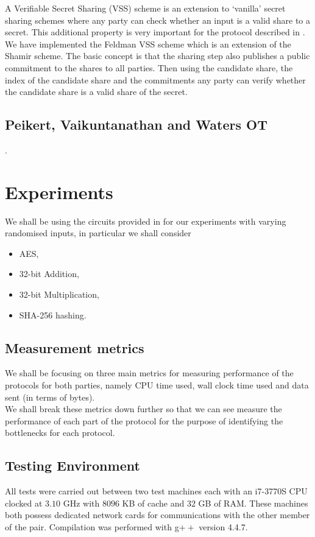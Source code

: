 \documentclass[ %
                    author={Nicholas Tutte},
                supervisor={Prof. Nigel Smart},
                    degree={MEng},
                     title={Secure Two Party Computation},
                  subtitle={A practical comparison of recent protocols},
                      type={Research - GG1K},
                      year={2015} ]{dissertation}
\begin{document}
				A Verifiable Secret Sharing (VSS) scheme is an extension to `vanilla' secret sharing schemes where any party can check whether an input is a valid share to a secret. This additional property is very important for the protocol described in \cite{Katz_Symm_CnC_2013}.\\

				We have implemented the Feldman VSS scheme which is an extension of the Shamir scheme. The basic concept is that the sharing step also publishes a public commitment to the shares to all parties. Then using the candidate share, the index of the  candidate share and the commitments any party can verify whether the candidate share is a valid share of the secret.

		\section{Peikert, Vaikuntanathan and Waters OT}

			.


	\chapter{Experiments} \label{sec:Results}
		We shall be using the circuits provided in \cite{NigelCircuits} for our experiments with varying randomised inputs, in particular we shall consider
		
		\begin{itemize}
			\item AES,
			\item 32-bit Addition,
			\item 32-bit Multiplication,
			\item SHA-256 hashing.
		\end{itemize}


		\section{Measurement metrics}
			We shall be focusing on three main metrics for measuring performance of the protocols for both parties, namely CPU time used, wall clock time used and data sent (in terms of bytes).\\

			We shall break these metrics down further so that we can see measure the performance of each part of the protocol for the purpose of identifying the bottlenecks for each protocol.

		\section{Testing Environment}
			All tests were carried out between two test machines each with an i7-3770S CPU clocked at $3.10$ GHz with $8096$ KB of cache and $32$ GB of RAM. These machines both possess dedicated network cards for communications with the other member of the pair. Compilation was performed with g$++$ version 4.4.7. 
\end{document}
